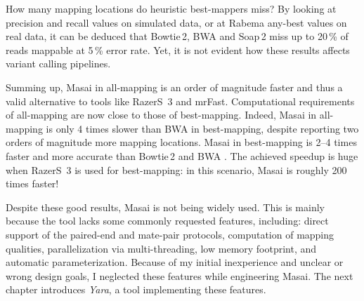 How many mapping locations do heuristic best-mappers miss?
By looking at precision and recall values on simulated data, or at Rabema any-best values on real data, it can be deduced that Bowtie\,2, BWA and Soap\,2 miss up to 20\,\% of reads mappable at 5\,\% error rate.
Yet, it is not evident how these results affects variant calling pipelines.

Summing up, Masai in all-mapping is an order of magnitude faster and thus a valid alternative to tools like RazerS~3 and mrFast.
Computational requirements of all-mapping are now close to those of best-mapping.
Indeed, Masai in all-mapping is only 4 times slower than BWA in best-mapping, despite reporting two orders of magnitude more mapping locations.
Masai in best-mapping is 2--4 times faster and more accurate than Bowtie\,2 \citep{Langmead2012} and BWA \citep{Li2009}.
The achieved speedup is huge when RazerS~3 is used for best-mapping: in this scenario, Masai is roughly 200 times faster!

Despite these good results, Masai is not being widely used.
This is mainly because the tool lacks some commonly requested features, including:
direct support of the paired-end and mate-pair protocols, computation of mapping qualities, parallelization via multi-threading, low memory footprint, and automatic parameterization.
Because of my initial inexperience and unclear or wrong design goals, I neglected these features while engineering Masai.
The next chapter introduces \emph{Yara}, a tool implementing these features.
